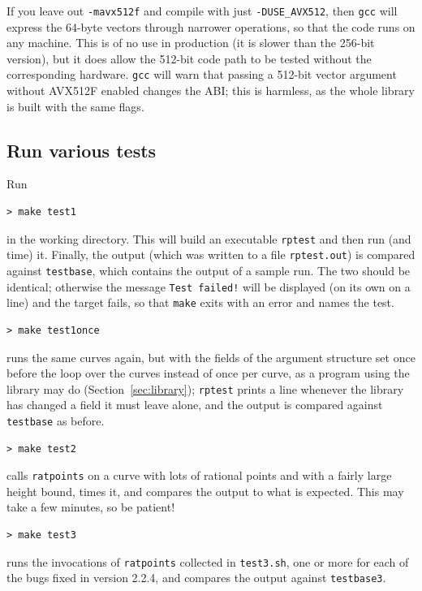 \documentclass[12pt,a4paper,oneside]{amsart}
\begin{document}
If you leave out \verb+-mavx512f+ and compile with just
\verb+-DUSE_AVX512+, then \texttt{gcc} will express the 64-byte vectors
through narrower operations, so that the code runs on any machine. This is
of no use in production (it is slower than the 256-bit version), but it
does allow the 512-bit code path to be tested without the corresponding
hardware. \texttt{gcc} will warn that passing a 512-bit vector argument
without AVX512F enabled changes the ABI; this is harmless, as the whole
library is built with the same flags.

\subsection{Run various tests}

Run

\begin{verbatim}
> make test1
\end{verbatim}

in the working directory. This will build an executable \texttt{rptest} and
then run (and time) it. Finally, the output (which was written to a file
\texttt{rptest.out}) is compared against \texttt{testbase}, which contains the
output of a sample run. The two should be identical; otherwise the
message \texttt{Test failed!} will be displayed (on its own on a line) and
the target fails, so that \texttt{make} exits with an error and names the
test.

\begin{verbatim}
> make test1once
\end{verbatim}
runs the same curves again, but with the fields of the argument structure
set once before the loop over the curves instead of once per curve, as a
program using the library may do (Section~\ref{sec:library});
\texttt{rptest} prints a line whenever the library has changed a field it
must leave alone, and the output is compared against \texttt{testbase} as
before.

\begin{verbatim}
> make test2
\end{verbatim}
calls \texttt{ratpoints} on a curve with lots of rational points and with
a fairly large height bound, times it, and compares the output to what is
expected. This may take a few minutes, so be patient!

\begin{verbatim}
> make test3
\end{verbatim}
runs the invocations of \texttt{ratpoints} collected in \texttt{test3.sh},
one or more for each of the bugs fixed in version 2.2.4, and compares the
output against \texttt{testbase3}.
\end{document}
